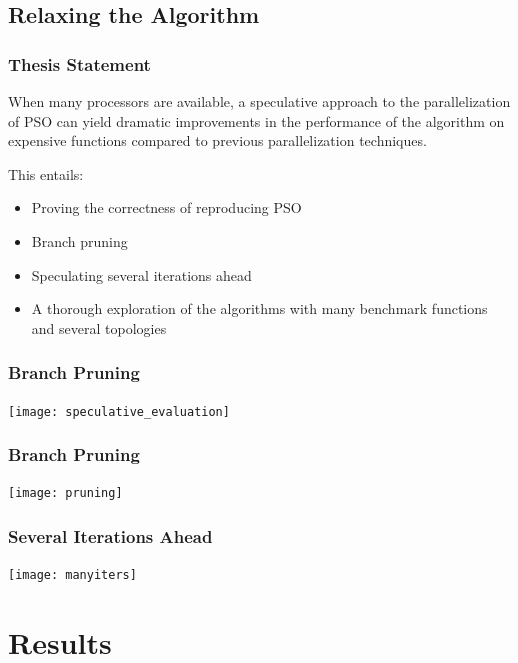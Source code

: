 \documentclass{beamer}
\begin{document}
\subsection{Relaxing the Algorithm}

\begin{frame}
  \frametitle{Thesis Statement}
When many processors are available, a speculative approach to the
parallelization of PSO can yield dramatic improvements in the performance of
the algorithm on expensive functions compared to previous parallelization
techniques.

\mbox{}

\pause
This entails:
\begin{itemize}
  \item Proving the correctness of reproducing PSO
  \item Branch pruning
  \item Speculating several iterations ahead
  \item A thorough exploration of the algorithms with many benchmark functions
	and several topologies
\end{itemize}
\end{frame}


\begin{frame}
  \frametitle{Branch Pruning}
  \begin{center}
	\texttt{[image: speculative\_evaluation]}
  \end{center}
\end{frame}

\begin{frame}
  \frametitle{Branch Pruning}
  \begin{center}
	\texttt{[image: pruning]}
  \end{center}
\end{frame}

\begin{frame}
  \frametitle{Several Iterations Ahead}
  \begin{center}
	\texttt{[image: manyiters]}
  \end{center}
\end{frame}

\section{Results}
\end{document}

